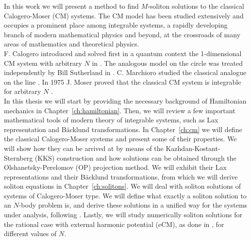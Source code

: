  In this work we will present a method to find $M$-soliton solutions to the classical Calogero-Moser (CM) systems. The CM model has been studied extensively  and occupies a prominent place among integrable systems, a rapidly developing branch of modern mathematical physics and beyond, at the crossroads of many areas of mathematics and theoretical physics. \\
 F. Calogero introduced and solved first in a quantum context the 1-dimensional CM system with arbitrary $N$ in \cite{calogero71}. The analogous model on the circle was treated independently by Bill Sutherland in \cite{sutherland}. C. Marchioro studied the classical analogue on the line \cite{marchioro1970, marchioro1974}. In 1975 J. Moser proved that the classical CM system is integrable for arbitrary $N$ \cite{moser1975}. \\
 In this thesis we will start by providing the necessary background of Hamiltonian mechanics in Chapter~\ref{ch:hamiltonian}. Then, we will review a few important mathematical tools of modern theory of integrable systems, such as Lax representation and Bäcklund transformations. In Chapter~\ref{ch:cm} we will define the classical Calogero-Moser systems and present some of their properties. We will show how they can be arrived at by means of the Kazhdan-Kostant-Sternberg (KKS) construction and how solutions can be obtained through the Olshanetsky-Perelomov (OP) projection method. We will exhibit their Lax representations and their Bäcklund transformations, from which we will derive soliton equations in Chapter~\ref{ch:solitons}.
 We will deal with soliton solutions of systems of Calogero-Moser type. We will define what exactly a soliton solution to an $N$-body problem is, and derive these solutions in a unified way for the systems under analysis, following \cite{philip2019soliton}. Lastly, we will study numerically soliton solutions for the rational case with external harmonic potential (eCM), as done in \cite{kulkarni2017, abanov2011}, for different values of $N$.